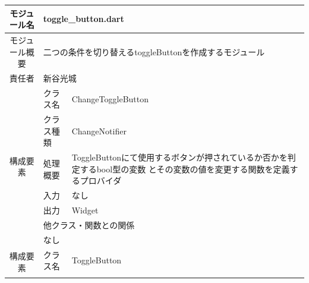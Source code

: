\clearpage
\begin{table}[H]
  \centering
  \begin{tabular}{|c|l|l|} \hline
    モジュール名                & \multicolumn{2}{l|}{toggle\_button.dart}                                                                                             \\ \hline
    モジュール概要               & \multicolumn{2}{p{12cm}|}{二つの条件を切り替えるtoggleButtonを作成するモジュール}                                                                          \\ \hline
    責任者                   & \multicolumn{2}{l|}{新谷光城}                                                                                                            \\ \hline
    \multirow{7}{*}{構成要素} & クラス名                                                        & ChangeToggleButton                                                     \\ \cline{2-3}
                          & クラス種類                                                       & ChangeNotifier                                                         \\ \cline{2-3}
                          & 処理概要                                                        & \multicolumn{1}{p{12cm}|}{ToggleButtonにて使用するボタンが押されているか否かを判定するbool型の変数
    とその変数の値を変更する関数を定義するプロバイダ}                                                                                                                                    \\ \cline{2-3}
                          & 入力                                                          & なし                                                                     \\ \cline{2-3}
                          & 出力                                                          & Widget                                                                 \\ \cline{2-3}
                          & \multicolumn{2}{l|}{他クラス・関数との関係}                                                                                                     \\ \cline{2-3}
                          & \multicolumn{2}{p{14cm}|}{なし}                                                                                                        \\ \hline
    \multirow{7}{*}{構成要素} & クラス名                                                        & ToggleButton                                                           \\ \cline{2-3}

\end{tabular}
\end{table}
